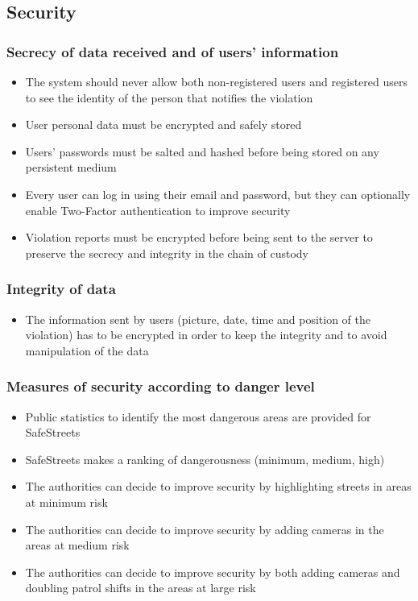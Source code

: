 \subsection{Security}
\subsubsection{Secrecy of data received and of users' information}
\begin{itemize}
    \item The system should never allow both non-registered users and registered users to see the identity of the person that notifies the violation
    \item User personal data must be encrypted and safely stored
    \item Users' passwords must be salted and hashed before being stored on any persistent medium
    \item Every user can log in using their email and password, but they can optionally enable Two-Factor authentication to improve security
    \item Violation reports must be encrypted before being sent to the server to preserve the secrecy and integrity in the chain of custody
\end{itemize}

\subsubsection{Integrity of data}
\begin{itemize}
    \item The information sent by users (picture, date, time and position of the violation) has to be encrypted in order to keep the integrity and to avoid manipulation of the data
\end{itemize}

\subsubsection{Measures of security according to danger level}
\begin{itemize}
  \item Public statistics to identify the most dangerous areas are provided for SafeStreets
  \item SafeStreets makes a ranking of dangerousness (minimum, medium, high)
  \item The authorities can decide to improve security by highlighting streets in areas at minimum risk
  \item The authorities can decide to improve security by adding cameras in the areas at medium risk 
  \item The authorities can decide to improve security by both adding cameras and doubling patrol shifts  in the areas at large risk
\end{itemize}

